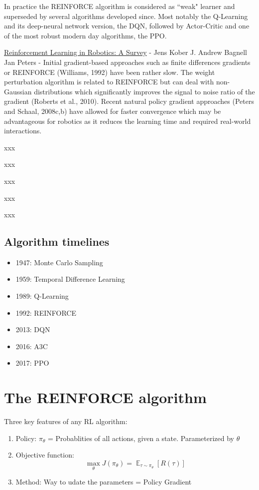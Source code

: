 \documentclass[]{article}
\begin{document}
In practice the REINFORCE algorithm is considered as ``weak" learner and superseded by several algorithms developed since. Most notably the Q-Learning and its deep-neural network version, the DQN, followed by Actor-Critic and one of the most robust modern day algorithms, the PPO. 

\href{https://www.ri.cmu.edu/pub_files/2013/7/Kober_IJRR_2013.pdf}{Reinforcement Learning in Robotics: A Survey}  - Jens Kober J. Andrew Bagnell Jan Peters -   
Initial gradient-based approaches such as finite differences gradients or REINFORCE
(Williams, 1992) have been rather slow. The weight perturbation algorithm is related to
REINFORCE but can deal with non-Gaussian distributions which significantly improves
the signal to noise ratio of the gradient (Roberts et al., 2010). Recent natural policy
gradient approaches (Peters and Schaal, 2008c,b) have allowed for faster convergence
which may be advantageous for robotics as it reduces the learning time and required
real-world interactions.


xxx \par
xxx \par
xxx \par
xxx \par
xxx \par

\subsection{Algorithm timelines}
\begin{itemize}
	\item 1947: Monte Carlo Sampling
	\item 1959: Temporal Difference Learning
	\item 1989: Q-Learning
	\item 1992: REINFORCE
	\item 2013: DQN
	\item 2016: A3C
	\item 2017: PPO 
\end{itemize}

\section{The REINFORCE algorithm}
Three key features of any RL algorithm:
\begin{enumerate}
	\item Policy: $\pi_\theta$ = Probablities of all actions, given a state. Parameterized by $\theta$
	\item Objective function:
	\begin{equation}
		\max_{\theta} J(\pi_{\theta}) = \mathop{\mathbb{E}}_{\tau \sim \pi_\theta} [R(\tau)]
	\end{equation}
	\item Method: Way to udate the parameters = Policy Gradient

\end{enumerate}
\end{document}
